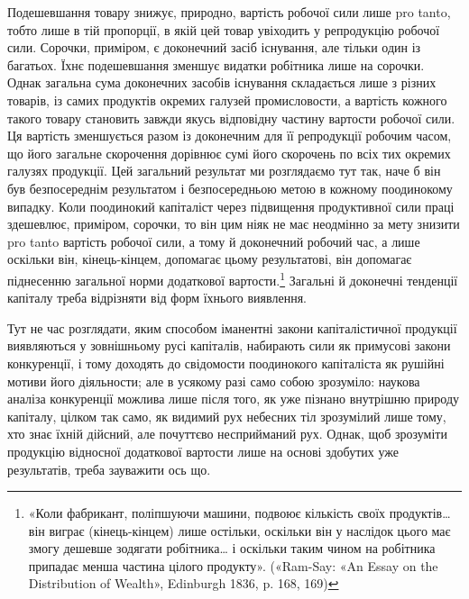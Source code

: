 Подешевшання товару знижує, природно, вартість робочої
сили лише pro tanto, тобто лише в тій пропорції, в якій цей товар
увіходить у репродукцію робочої сили. Сорочки, приміром, є
доконечний засіб існування, але тільки один із багатьох. Їхнє
подешевшання зменшує видатки робітника лише на сорочки.
Однак загальна сума доконечних засобів існування складається
лише з різних товарів, із самих продуктів окремих галузей
промисловости, а вартість кожного такого товару становить завжди
якусь відповідну частину вартости робочої сили. Ця вартість
зменшується разом із доконечним для її репродукції робочим
часом, що його загальне скорочення дорівнює сумі його скорочень
по всіх тих окремих галузях продукції. Цей загальний результат
ми розглядаємо тут так, наче б він був безпосереднім результатом
і безпосередньою метою в кожному поодинокому випадку. Коли
поодинокий капіталіст через підвищення продуктивної сили праці
здешевлює, приміром, сорочки, то він цим ніяк не має неодмінно за
мету знизити pro tanto вартість робочої сили, а тому й доконечний
робочий час, а лише оскільки він, кінець-кінцем, допомагає
цьому результатові, він допомагає піднесенню загальної норми
додаткової вартости.\footnote{
«Коли фабрикант, поліпшуючи машини, подвоює кількість своїх
продуктів\dots{} він виграє (кінець-кінцем) лише остільки,
оскільки він у наслідок цього має змогу дешевше зодягати
робітника\dots{} і оскільки таким
чином на робітника припадає менша частина цілого продукту». («Ram-Say:
«An Essay on the Distribution of Wealth», Edinburgh 1836, p. 168, 169)
}
Загальні й доконечні тенденції капіталу
треба відрізняти від форм їхнього виявлення.

Тут не час розглядати, яким способом іманентні закони капіталістичної
продукції виявляються у зовнішньому русі капіталів,
набирають сили як примусові закони конкуренції, і тому доходять
до свідомости поодинокого капіталіста як рушійні мотиви
його діяльности; але в усякому разі само собою зрозуміло: наукова
аналіза конкуренції можлива лише після того, як уже пізнано
внутрішню природу капіталу, цілком так само, як видимий рух
небесних тіл зрозумілий лише тому, хто знає їхній дійсний, але
почуттєво несприйманий рух. Однак, щоб зрозуміти продукцію
відносної додаткової вартости лише на основі здобутих уже результатів,
треба зауважити ось що.

